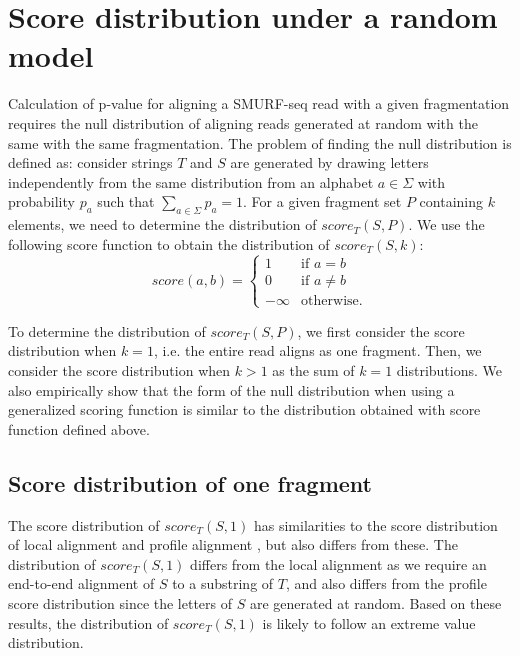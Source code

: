 \section{Score distribution under a random model}
Calculation of p-value for aligning a SMURF-seq read with a given
fragmentation requires the null distribution of aligning reads
generated at random with the same with the same fragmentation. The
problem of finding the null distribution is defined as:
consider strings $T$ and $S$ are generated by drawing letters independently
from the same distribution from an alphabet $a \in \Sigma$ with
probability $p_a$ such that $\sum_{a \in \Sigma} p_a = 1$.  For a given
fragment set $P$ containing $k$ elements, we need to determine the
distribution of $score_T(S, P)$.
We use the following score function to obtain the distribution of
$score_T(S,k)$:
\begin{equation*}
\label{exact_score}
score(a,b)=\begin{cases} 1 & \text{if } a = b \\
            0 & \text{if } a\neq b \\
            -\infty & \text{otherwise.}
\end{cases}
\end{equation*}

To determine the distribution of $score_T(S, P)$, we first consider the score
distribution when $k = 1$, i.e. the entire read aligns as one fragment.
Then, we consider the score distribution when $k > 1$ as the sum of $k =
1$ distributions. We also empirically show that the form of the null
distribution when using a generalized scoring function is similar to the
distribution obtained with score function defined above.


\subsection{Score distribution of one fragment}
The score distribution of $score_T(S,1)$ has similarities to the score
distribution of local alignment \citep{} and profile alignment \citep{},
but also differs from these.  The distribution of $score_T(S,1)$ differs
from the local alignment as we require an end-to-end alignment of $S$ to
a substring of $T$, and also differs from the profile score distribution
since the letters of $S$ are generated at random.
Based on these results, the distribution of $score_T(S,1)$ is likely to
follow an extreme value distribution.


